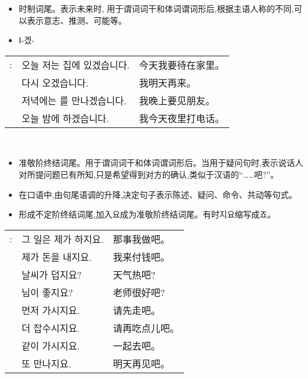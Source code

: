 \begin{grammar}
	\begin{grammarsect}[\kr -겠-]
		\begin{itemize}
			\item 时制词尾。表示未来时, 用于谓词词干和体词谓词形后,根据主语人称的不同,可以表示意志、推测、可能等。
			\item {\kr \color{gray} Ⅰ-겠-}
		\end{itemize}
		\begin{tabular}{lll}
			\kr \ruby{例}{예}: & \kr 오늘 저는 집에 있겠습니다.             & 今天我要待在家里。 \\
			             & \kr \ruby{來日}{내일} 다시 오겠습니다.     & 我明天再来。    \\
			             & \kr 저녁에는 \ruby{親舊}{친구}를 만나겠습니다. & 我晚上要见朋友。  \\
			             & \kr 오늘 밤에 \ruby{電話}{전화}하겠습니다.   & 我今天夜里打电话。
		\end{tabular}\\
	\end{grammarsect}
	\begin{grammarsect}[\kr -지요]
		\begin{itemize}
			\item 准敬阶终结词尾。用于谓词词干和体词谓词形后。当用于疑问句时,表示说话人对所提问题已有所知,只是希望得到对方的确认,类似于汉语的“……吧?”。
			\item 在口语中,由句尾语调的升降,决定句子表示陈述、疑问、命令、共动等句式。
			\item {\color{gray}{\kr  Ⅰ-지-요。Ⅰ-지}形成不定阶终结词尾,加入{\kr 요}成为准敬阶终结词尾。有时{\kr 지요}缩写成{\kr 죠}。}
		\end{itemize}
		\begin{tabular}{lll}
			\kr \ruby{例}{예}: &\kr  그 일은 제가 하지요.          & 那事我做吧。  \\
			             &\kr  제가 돈을 내지요.            & 我来付钱吧。  \\
			             & \kr 날씨가 덥지요?              & 天气热吧?   \\
			             & \kr \ruby{先生}{선생}님이 좋지요?  & 老师很好吧?  \\
			             & \kr 먼저 가시지요.              & 请先走吧。   \\
			             & \kr 더 잡수시지요.              & 请再吃点儿吧。 \\
			             & \kr 같이 가시지요.              & 一起去吧。   \\
			             & \kr \ruby{來日}{내일} 또 만나지요. & 明天再见吧。  \\
		\end{tabular}\\
	\end{grammarsect}
\end{grammar}
